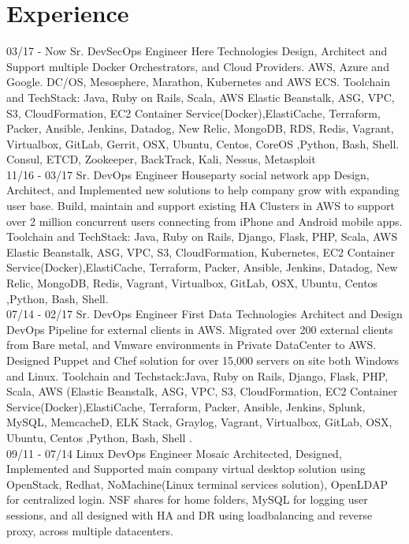 \documentclass[]{friggeri-cv}
\begin{document}
\section{Experience}
\begin{entrylist}
\entry
    {03/17 - Now}
    {Sr. DevSecOps Engineer}
    { Here Technologies }
    {Design, Architect and Support multiple Docker Orchestrators, and Cloud Providers. AWS, Azure and Google. DC/OS, Mesosphere, Marathon, Kubernetes and AWS ECS. Toolchain and TechStack: Java, Ruby on Rails, Scala, AWS Elastic Beanstalk, ASG, VPC, S3, CloudFormation, EC2 Container Service(Docker),ElastiCache, Terraform, Packer, Ansible, Jenkins, Datadog, New Relic, MongoDB, RDS, Redis, Vagrant, Virtualbox, GitLab, Gerrit, OSX, Ubuntu, Centos, CoreOS ,Python, Bash, Shell. Consul, ETCD, Zookeeper, BackTrack, Kali, Nessus, Metasploit\\}
\entry
    {11/16 - 03/17}
    {Sr. DevOps Engineer}
    { Houseparty social network app }
    {Design, Architect, and Implemented new solutions to help company grow with expanding user base.           Build, maintain and support existing HA Clusters in AWS to support over 2 million concurrent users connecting from iPhone and Android mobile apps.     Toolchain and TechStack: Java, Ruby on Rails, Django, Flask, PHP, Scala, AWS Elastic Beanstalk, ASG, VPC, S3, CloudFormation, Kubernetes, EC2 Container Service(Docker),ElastiCache, Terraform, Packer, Ansible, Jenkins, Datadog, New Relic, MongoDB, Redis, Vagrant, Virtualbox, GitLab, OSX, Ubuntu, Centos ,Python, Bash, Shell.\\}
  \entry
    {07/14 - 02/17}
    {Sr. DevOps Engineer}
    {First Data Technologies }
    {Architect and Design DevOps Pipeline for external clients in AWS.           Migrated over 200 external clients from Bare metal, and Vmware environments in Private DataCenter to AWS. Designed Puppet and Chef solution for over 15,000 servers on site both Windows and Linux.     Toolchain and Techstack:Java, Ruby on Rails, Django, Flask, PHP, Scala, AWS (Elastic Beanstalk, ASG, VPC, S3, CloudFormation, EC2 Container Service(Docker),ElastiCache, Terraform, Packer, Ansible, Jenkins, Splunk, MySQL, MemcacheD, ELK Stack, Graylog, Vagrant, Virtualbox, GitLab, OSX, Ubuntu, Centos ,Python, Bash, Shell .\\}
  \entry
    {09/11 - 07/14}
    {Linux DevOps Engineer}
    {Mosaic}
    {Architected, Designed, Implemented and Supported main company virtual desktop solution using OpenStack, Redhat, NoMachine(Linux terminal services solution), OpenLDAP for centralized login. NSF shares for home folders, MySQL for logging user sessions, and all designed with HA and DR using loadbalancing and reverse proxy, across multiple datacenters.\\}

\end{entrylist}
\end{document}

